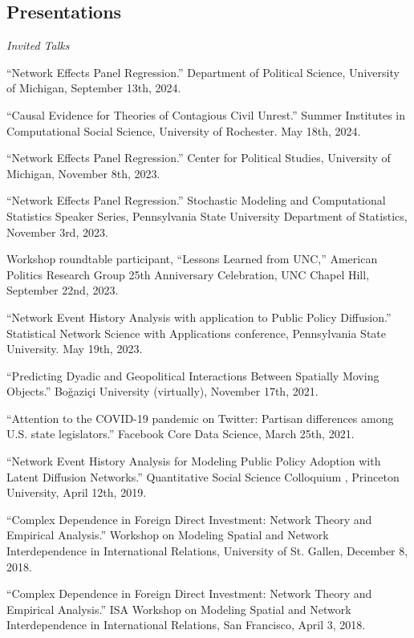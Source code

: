 \documentclass[overlapped,line]{res}
\begin{document}
\begin{resume}
\section{\bf Presentations}
\vspace{.1cm}
\hspace{-1cm} \emph{Invited Talks}
\begin{etaremune} 
\item ``Network Effects Panel Regression.'' Department of Political Science, University of Michigan, September 13th, 2024.
\item ``Causal Evidence for Theories of Contagious Civil Unrest.'' Summer Institutes in Computational Social Science, University of Rochester. May 18th, 2024. 
\item ``Network Effects Panel Regression.'' Center for Political Studies, University of Michigan, November 8th, 2023.
\item ``Network Effects Panel Regression.'' Stochastic Modeling and Computational Statistics Speaker Series, Pennsylvania State University Department of Statistics, November 3rd, 2023.
\item Workshop roundtable participant, ``Lessons Learned from UNC,'' American Politics Research Group 25th Anniversary Celebration, UNC Chapel Hill, September 22nd, 2023. 
\item ``Network Event History Analysis with application to Public Policy Diffusion.'' Statistical Network Science with Applications conference, Pennsylvania State University. May 19th, 2023.
\item ``Predicting Dyadic and Geopolitical Interactions Between Spatially Moving Objects.'' Boğaziçi University (virtually), November 17th, 2021.
\item ``Attention to the COVID-19 pandemic on Twitter: Partisan differences among U.S. state legislators.'' Facebook Core Data Science, March 25th, 2021.
\item ``Network Event History Analysis for Modeling Public Policy Adoption with Latent Diffusion Networks.''  Quantitative Social Science Colloquium , Princeton University, April 12th, 2019.
\item ``Complex Dependence in Foreign Direct Investment: Network Theory and Empirical Analysis.'' Workshop on Modeling Spatial and Network Interdependence in International Relations, University of St. Gallen, December 8, 2018.
\item ``Complex Dependence in Foreign Direct Investment: Network Theory and Empirical Analysis.'' ISA Workshop on Modeling Spatial and Network Interdependence in International Relations, San Francisco, April 3, 2018.

\end{etaremune}
\end{resume}
\end{document}
